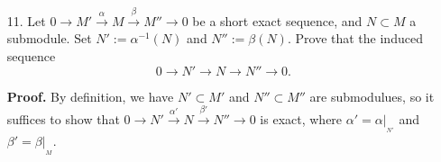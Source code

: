 \documentclass[9pt]{article}
\begin{document}
\begin{enumerate}
   \item[11.]  Let $0 \rightarrow M' \stackrel{\alpha}{\longrightarrow} M
               \stackrel{\beta}{\longrightarrow} M'' \rightarrow 0$ be a
               short exact sequence, and $N \subset M$ a submodule. Set
               $N' := \alpha^{-1}(N)$ and $N'' := \beta(N)$. Prove that the
               induced sequence
               $$0 \rightarrow N' \rightarrow N \rightarrow N'' \rightarrow 0.$$

      \textbf{Proof.} By definition, we have $N' \subset M'$ and
      $N'' \subset M''$ are submodulues, so it suffices to show that
      $0 \rightarrow N' \stackrel{\alpha'}{\longrightarrow} N
      \stackrel{\beta'}{\longrightarrow}N'' \rightarrow 0$ is exact, where
      $\alpha' = \alpha|_{_{N'}}$ and $\beta' = \beta|_{_{M}}$.


\end{enumerate}
\end{document}
